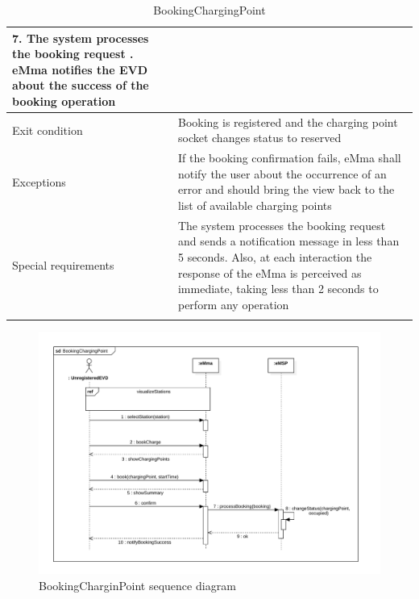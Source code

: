 \begin{center}
\begin{longtable}{p{4cm} p{11cm}}
        7. The system processes the booking request \newline
        8. eMma notifies the EVD about the success of the booking operation\\
     \hline
     Exit condition &  Booking is registered and the charging point socket changes status to reserved\\
     \hline
     Exceptions &
        If the booking confirmation fails, eMma shall notify the user about the occurrence of an error and should bring the view back to the list of available charging points\\
     \hline
     Special requirements &  
        The system processes the booking request and sends a notification message in less than 5 seconds. Also, at each interaction the response of the eMma is perceived as immediate, taking less than 2 seconds to perform any operation\\
     \hline
    \caption{BookingChargingPoint}
    \label{tab:BookingChargingPoint}
    \end{longtable}
\end{center}
\begin{figure}[H]
    \centering
    \includegraphics[width=\textwidth, trim={0 0 0 0}, clip]{Images/cp3/seqDiagrams/BookCharginPoint.pdf}
    \caption{BookingCharginPoint sequence diagram}
\end{figure}

